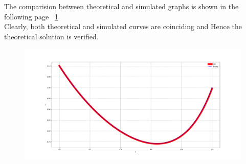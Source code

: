 \documentclass[journal]{IEEEtran}
\begin{document}
The comparision between theoretical and simulated graphs is shown in the following page ~\ref{fig:1}\\
Clearly, both theoretical and simulated curves are coinciding and Hence the theoretical solution is verified.
\begin{figure}[ht]
    \centering
    \includegraphics[width=\columnwidth]{figs/Figure_1.png}
    \caption{}
    \label{fig:1}
\end{figure}
\end{document}
